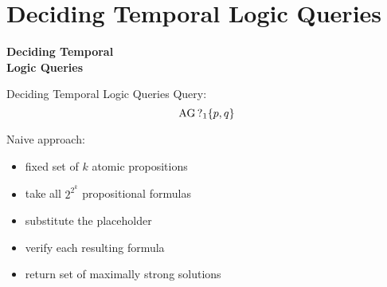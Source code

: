 \section{Deciding Temporal Logic Queries}

\begin{frame}[plain]
  \vfill

  \begin{center}
    \Huge \color{oceangreen} \bfseries 
    Deciding Temporal\\ Logic Queries
  \end{center}

  \vfill
\end{frame}

\begin{frame}{Deciding Temporal Logic Queries}
  Query:
  \[ \operatorname{AG} \operatorname{?}_1 \{p,q\} \]
  
  Naive approach:
  \begin{itemize}
    \item fixed set of $k$ atomic propositions
    \item take all $2^{2^k}$ propositional formulas
    \item substitute the placeholder
    \item verify each resulting formula
    \item return set of maximally strong solutions
  \end{itemize}
\end{frame}


\begin{frame}[plain]
  \vfill

  \begin{center}
  \end{center}

  \vfill
\end{frame}

